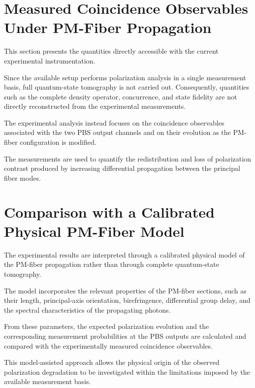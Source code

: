 \section{Measured Coincidence Observables Under PM-Fiber Propagation}
\label{sec:pm_fiber_observables}

This section presents the quantities directly accessible with the current
experimental instrumentation.

Since the available setup performs polarization analysis in a single measurement
basis, full quantum-state tomography is not carried out. Consequently, quantities
such as the complete density operator, concurrence, and state fidelity are not
directly reconstructed from the experimental measurements.

The experimental analysis instead focuses on the coincidence observables
associated with the two PBS output channels and on their evolution as the
PM-fiber configuration is modified.

The measurements are used to quantify the redistribution and loss of polarization
contrast produced by increasing differential propagation between the principal
fiber modes.



\section{Comparison with a Calibrated Physical PM-Fiber Model}
\label{sec:pm_fiber_model_comparison}

The experimental results are interpreted through a calibrated physical model of
the PM-fiber propagation rather than through complete quantum-state tomography.

The model incorporates the relevant properties of the PM-fiber sections, such as
their length, principal-axis orientation, birefringence, differential group delay,
and the spectral characteristics of the propagating photons.

From these parameters, the expected polarization evolution and the corresponding
measurement probabilities at the PBS outputs are calculated and compared with
the experimentally measured coincidence observables.

This model-assisted approach allows the physical origin of the observed
polarization degradation to be investigated within the limitations imposed by
the available measurement basis.


